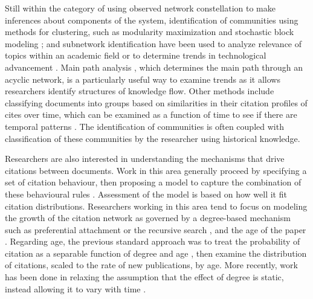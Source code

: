 \documentclass[headsepline=true, abstracton]{scrartcl}
\begin{document}
	Still within the category of using observed network constellation to make inferences about components of the system, identification of communities using methods for clustering, such as modularity maximization \citep[e.g.][]{kajikawa2007creating,shibata2011detecting,chen2010community} and stochastic block modeling \citep{jo2009citing}; and subnetwork identification \citep[e.g.][]{batagelj2017emergence} have been used to analyze relevance of topics within an academic field or to determine trends in technological advancement \citep{verspagen2007mapping,erdi2013prediction}. Main path analysis \citep{hummon1989connectivity}, which determines the main path through an acyclic network, is a particularly useful way to examine trends as it allows researchers identify structures of knowledge flow. Other methods include classifying documents into groups based on similarities in their citation profiles of cites over time, which can be examined as a function of time to see if there are temporal patterns \citep{leicht2007large}. The identification of communities is often coupled with classification of these communities by the researcher using historical knowledge. 
	
	Researchers are also interested in understanding the mechanisms that drive citations between documents. Work in this area generally proceed by specifying a set of citation behaviour, then proposing a model to capture the combination of these behavioural rules \citep{simkin2007mathematical}. Assessment of the model is based on how well it fit citation distributions. Researchers working in this area tend to focus on modeling the growth of the citation network as governed by a degree-based mechanism such as preferential attachment \citep{barabasi1999emergence} or the recursive search \citep{vazquez2001statistics}, and the age of the paper \citep{jeong2003measuring,eom2011characterizing,wang2013quantifying}. Regarding age, the previous standard approach was to treat the probability of citation as a separable function of degree and age \citep{hajra2005aging,hajra2006modelling}, then examine the distribution of citations, scaled to the rate of new publications, by age. More recently, work has been done in relaxing the assumption that the effect of degree is static, instead allowing it to vary with time \citep{wang2008measuring}.
	
\end{document}
